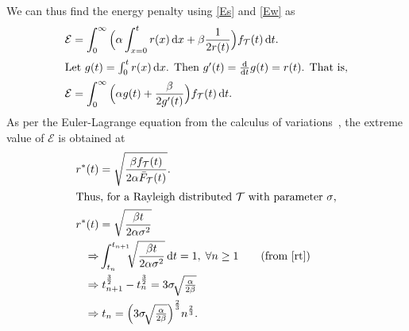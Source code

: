 We can thus find the energy penalty using \cref{Es} and \cref{Ew} as
\begin{alignat*}{1}
\mathcal{E}&=\int_{0}^{\infty}\Big(\alpha\int_{x=0}^{t}r(x)\,\mathrm{d}x+\beta\dfrac{1}{2r(t)}\Big)f_{\mathcal{T}}(t)\,\mathrm{d}t.\label{epsilon_eulerForm}\\
\intertext{Let $g(t)=\int_{0}^{t}r(x)\dif x$. Then  $g'(t)=\tfrac{\mathrm{d}}{\mathrm{d}t}g(t)=r(t)$. That is,}
\vspace{-4cm}\mathcal{E}&=\int_{0}^{\infty}\Big(\alpha g(t)+\dfrac{\beta}{2g'(t)}\Big)f_{\mathcal{T}}(t)\,\mathrm{d}t.
\end{alignat*}
As per the Euler-Lagrange equation from the calculus of variations~\cite{calcVariation2,calcVariation1}, the extreme value of $\mathcal{E}$ is obtained at 
\begin{alignat}{1}
r^*(t)&=\sqrt{\dfrac{\beta f_\mathcal{T}(t)}{2\alpha\bar{F}_\mathcal{T}(t)}}.\\
\intertext{Thus, for a Rayleigh distributed $\mathcal{T}$ with parameter $\sigma$,}
r^*(t)&=\sqrt{\dfrac{\beta t}{2\alpha\sigma^2}}\\
\Rightarrow &\int_{t_n}^{t_{n+1}}\!\!\!\sqrt{\dfrac{\beta t}{2\alpha\sigma^2}}\,\mathrm{d}t=1,\;\forall n\geq1\nonumber\tag{from \eqref{rt}}\\
\Rightarrow &\;t_{n+1}^{\frac{3}{2}}-t_{n}^{\frac{3}{2}}=3\sigma\!\sqrt{\tfrac{\alpha}{2\beta}}\nonumber\\
\Rightarrow &\;t_n=\Big(3\sigma\!\sqrt{\tfrac{\alpha}{2\beta}}\Big)^{\frac{2}{3}}n^{\frac{2}{3}}.
\end{alignat}

